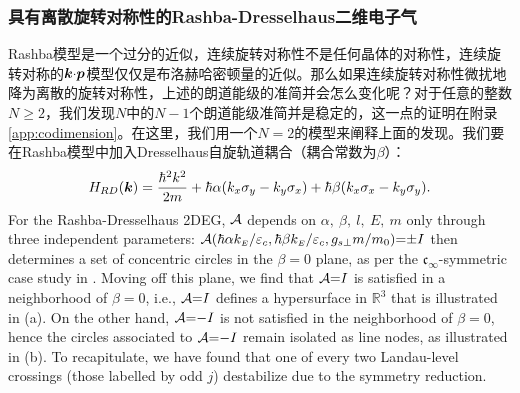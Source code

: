 \subsubsection{具有离散旋转对称性的Rashba-Dresselhaus二维电子气}\label{sec:disrot}

Rashba模型是一个过分的近似，连续旋转对称性不是任何晶体的对称性，连续旋转对称的$\boldsymbol{k}{\cdot}\boldsymbol{p}$模型仅仅是布洛赫哈密顿量的近似。那么如果连续旋转对称性微扰地降为离散的旋转对称性，上述的朗道能级的准简并会怎么变化呢？对于任意的整数$N{\geq}2$，我们发现$N$中的$N{-}1$个朗道能级准简并是稳定的，这一点的证明在附录\ref{app:codimension}。在这里，我们用一个$N{=}2$的模型来阐释上面的发现。我们要在Rashba模型中加入Dresselhaus自旋轨道耦合（耦合常数为$\beta$）：
\begin{equation}
H_{RD}(\boldsymbol{k})=\frac{{\hbar^2}k^2}{2m}+\hbar\alpha(k_{x}\sigma_{y}-k_{y}\sigma_{x})+\hbar\beta(k_{x}\sigma_{x}-k_{y}\sigma_{y}).\label{hamRD}
\end{equation}
{For the Rashba-Dresselhaus 2DEG, ${\cal A}$ depends on $\alpha,~\beta,~l,~E,~m$ only through three independent parameters:}%
${\cal A}(\hbar\alpha k_{\scriptscriptstyle{E}}/\varepsilon_c,\hbar\beta k_{\scriptscriptstyle{E}}/\varepsilon_c,g_{s\perp}m/m_0){=}{\pm} I$ then determines a set of concentric circles in the $\beta{=}0$ plane, as per the $\mathfrak{c}_{\infty}$-symmetric case study in . Moving off this plane, we find that ${\cal A}{=}I$ is satisfied in a  neighborhood of $\beta{=}0$, i.e., ${\cal A}{=}I$ defines a hypersurface in $\mathbb{R}^3$ that is illustrated in (a). On the other hand, ${\cal A}{=}{-}I$ is not satisfied in the neighborhood of $\beta{=}0$, hence the circles associated to ${\cal A}{=}{-}I$ remain isolated as line nodes, as illustrated in (b). To recapitulate, we have found that one of every two Landau-level crossings (those labelled by odd $j$) destabilize due to the symmetry reduction.

